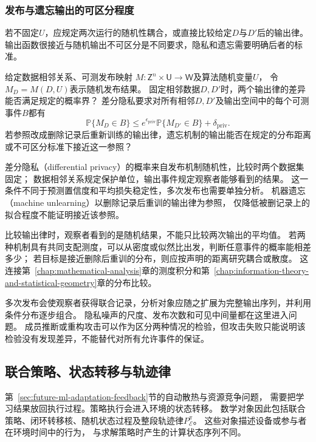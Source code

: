 \subsubsection{发布与遗忘输出的可区分程度}
\label{sec:future-analysis-output-law}

若不固定$U$，应规定两次运行的随机性耦合，或直接比较给定$D$与$D'$后的输出律。
输出函数很接近与随机输出不可区分是不同要求，隐私和遗忘需要明确后者的标准。

\begin{mathproblem}[随机输出律的可区分程度]
  \label{question:future-output-law}
  给定数据相邻关系、可测发布映射
  $M:\mathsf Z^n\times\mathsf U\to\mathsf W$及算法随机变量$U$，
  令$M_D=M(D,U)$表示随机发布结果。
  固定相邻数据$D,D'$时，两个输出律的差异能否满足规定的概率界？
  差分隐私要求对所有相邻$D,D'$及输出空间中的每个可测事件$B$都有
  \[
    \mathbb P\{M_D\in B\}
    \leq e^{\epsilon_{\mathrm{priv}}}
       \mathbb P\{M_{D'}\in B\}+\delta_{\mathrm{priv}}.
  \]
  若参照改成删除记录后重新训练的输出律，遗忘机制的输出能否在规定的分布距离
  或不可区分标准下接近这一参照？
\end{mathproblem}

差分隐私（differential privacy）的概率来自发布机制随机性，比较时两个数据集固定；
数据相邻关系规定保护单位，输出事件规定观察者能够看到的结果。
这一条件不同于预测置信度和平均损失稳定性，多次发布也需要单独分析。
机器遗忘（machine unlearning）以删除记录后重训的输出律为参照，
仅降低被删记录上的拟合程度不能证明接近该参照。

比较输出律时，观察者看到的是随机结果，不能只比较两次输出的平均值。
若两种机制具有共同支配测度，可以从密度或似然比出发，判断任意事件的概率能相差多少；
若目标是接近删除后重训的分布，则应按声明的距离研究耦合或散度。
这连接第~\ref{chap:mathematical-analysis}章的测度积分和第~\ref{chap:information-theory-and-statistical-geometry}章的分布比较。

多次发布会使观察者获得联合记录，分析对象应随之扩展为完整输出序列，并利用条件分布逐步组合。
隐私噪声的尺度、发布次数和可见中间量都在这里进入问题。
成员推断或重构攻击可以作为区分两种情况的检验，但攻击失败只能说明该检验没有发现差异，不能替代对所有允许事件的保证。

\subsection{联合策略、状态转移与轨迹律}
\label{sec:future-feedback-theory-map}

第~\ref{sec:future-ml-adaptation-feedback}节的自动散热与资源竞争问题，
需要把学习结果放回执行过程。策略执行会进入环境的状态转移。
数学对象因此包括联合策略、闭环转移核、随机状态过程及整段轨迹律$P_{\mathcal E}^{\pi}$。
这些对象描述设备或参与者在环境时间中的行为，
与求解策略时产生的计算状态序列不同。

